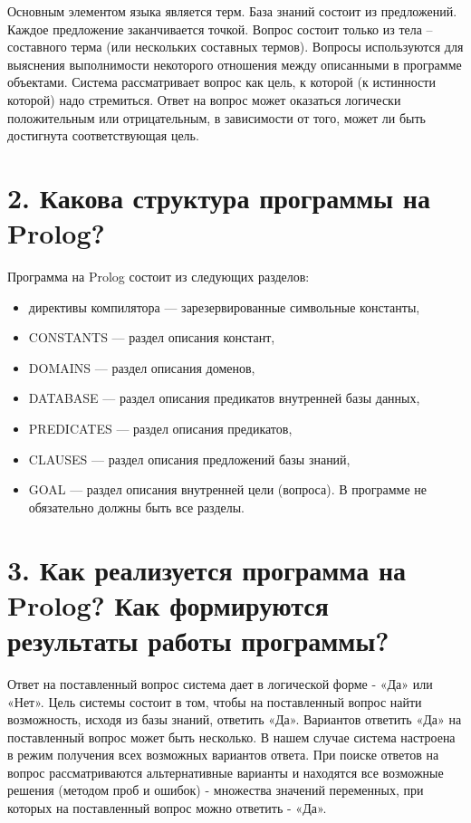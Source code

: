 \documentclass[12pt]{report}
\begin{document}
Основным элементом языка является терм. База знаний состоит из предложений. Каждое предложение заканчивается точкой. Вопрос состоит только из тела – составного терма (или нескольких составных термов). Вопросы используются для выяснения выполнимости некоторого отношения между описанными в программе объектами. Система рассматривает вопрос как цель, к которой (к истинности которой) надо стремиться. Ответ на вопрос может оказаться логически положительным или отрицательным, в зависимости от того, может ли быть достигнута соответствующая цель.

\section*{2. Какова структура программы на Prolog?}

Программа на Prolog состоит из следующих разделов:

\begin{itemize}
	\item директивы компилятора — зарезервированные символьные константы,
	\item CONSTANTS — раздел описания констант,
	\item DOMAINS — раздел описания доменов,
	\item DATABASE — раздел описания предикатов внутренней базы данных,
	\item PREDICATES — раздел описания предикатов,
	\item CLAUSES — раздел описания предложений базы знаний,
	\item GOAL — раздел описания внутренней цели (вопроса).
	В программе не обязательно должны быть все разделы.
\end{itemize}

\section*{3. Как реализуется программа на Prolog? Как формируются результаты работы программы?}

Ответ на поставленный вопрос система дает в логической форме - «Да» или «Нет». Цель системы состоит в том, чтобы на поставленный вопрос найти возможность, исходя из базы знаний, ответить «Да». Вариантов ответить «Да» на поставленный вопрос может быть несколько. В нашем случае система настроена в режим получения всех возможных вариантов ответа. При поиске ответов на вопрос рассматриваются альтернативные варианты и находятся все возможные решения (методом проб и ошибок) - множества значений переменных, при которых на поставленный вопрос можно ответить - «Да».
\end{document}
